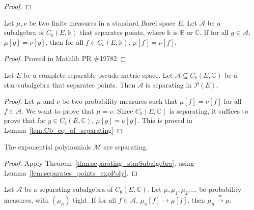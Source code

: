 \begin{proof}\leanok
{}
\end{proof}


\begin{lemma}\label{lem:Cb_eq_of_separating}
Let $\mu, \nu$ be two finite measures in a standard Borel space $E$. Let $\mathcal{A}$ be a subalgebra of $C_b(E, \mathbb{k})$ that separates points, where $\mathbb{k}$ is $\mathbb{R}$ or $\mathbb{C}$.
If for all $g \in \mathcal A$, $\mu[g] = \nu[g]$, then for all $f \in C_b(E, \mathbb{k})$, $\mu[f] = \nu[f]$.
\end{lemma}

\begin{proof}
Proved in Mathlib PR \#19782
\end{proof}


\begin{theorem}\label{thm:separating_starSubalgebra}
Let $E$ be a complete separable pseudo-metric space. Let $\mathcal A \subseteq C_b(E, \mathbb{C})$ be a star-subalgebra that separates points. Then $\mathcal A$ is separating in $\mathcal P(E)$.
\end{theorem}

\begin{proof}
Let $\mu$ and $\nu$ be two probability measures such that $\mu[f] = \nu[f]$ for all $f \in \mathcal A$. We want to prove that $\mu = \nu$. Since $C_b(E, \mathbb{C})$ is separating, it suffices to prove that for $g \in C_b(E, \mathbb{C})$, $\mu[g] = \nu[g]$. This is proved in Lemma~\ref{lem:Cb_eq_of_separating}
\end{proof}


\begin{lemma}\label{lem:separating_expPoly}
The exponential polynomials $\mathcal M$ are separating.
\end{lemma}

\begin{proof}
Apply Theorem~\ref{thm:separating_starSubalgebra}, using Lemma~\ref{lem:separates_points_expPoly}.
\end{proof}


\begin{lemma}\label{lem:cvg_of_separating}
Let $\mathcal A$ be a separating subalgebra of $C_b(E, \mathbb{C})$. Let $\mu, \mu_1, \mu_2, \ldots$ be probability measures, with $(\mu_n)$ tight. If for all $f \in \mathcal A$, $\mu_n[f] \to \mu[f]$, then $\mu_n \xrightarrow{w} \mu$.
\end{lemma}

